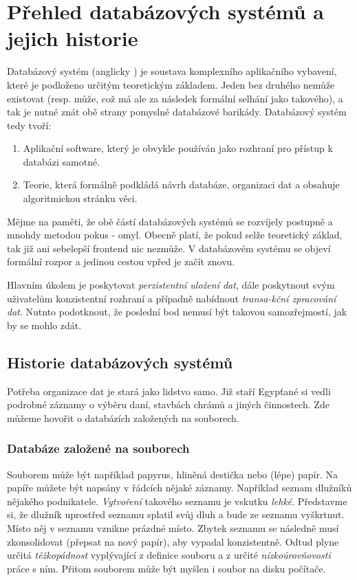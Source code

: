 \section{Přehled databázových systémů a jejich historie}

Databázový systém (anglicky ) je soustava komplexního aplikačního vybavení, které je podloženo určitým teoretickým základem. Jeden bez druhého nemůže existovat (resp. může, což má ale za následek formální selhání  jako takového), a tak je nutné znát obě strany pomyslné databázové barikády. Databázový systém tedy tvoří:
\begin{enumerate}
\item Aplikační software, který je obvykle používán jako rozhraní pro přístup k databázi samotné.
\item Teorie, která formálně podkládá návrh databáze, organizaci dat a obsahuje algoritmickou stránku věci.
\end{enumerate}

Mějme na paměti, že obě částí databázových systémů se rozvíjely postupně a mnohdy metodou pokus - omyl. Obecně platí, že pokud selže teoretický základ, tak již ani sebelepší frontend nic nezmůže. V databázovém systému se objeví formální rozpor a jedinou cestou vpřed je začít znovu.

Hlavním úkolem  je poskytovat \textit{perzistentní uložení dat}, dále poskytnout svým uživatelům konzistentní rozhraní a případně nabídnout \textit{transa-kční zpracování dat}. Nutnto podotknout, že poslední bod nemusí být takovou samozřejmostí, jak by se mohlo zdát.

\subsection{Historie databázových systémů}
Potřeba organizace dat je stará jako lidstvo samo. Již staří Egypťané si vedli podrobné záznamy o výběru daní, stavbách chrámů a jiných činnostech. Zde můžeme hovořit o databázích založených na souborech.

\subsubsection{Databáze založené na souborech}
Souborem může být například papyrus, hliněná destička nebo (lépe) papír. Na papíře můžete být napsány v řádcích nějaké záznamy. Například seznam dlužníků nějakého podnikatele. \textit{Vytvoření} takového seznamu je vskutku \textit{lehké}. Představme si, že dlužník uprostřed seznamu splatil svůj dluh a bude ze seznamu vyškrtnut. Místo něj v seznamu vznikne prázdné místo. Zbytek seznamu se následně musí zkonsolidovat (přepsat na nový papír), aby vypadal konzistentně. Odtud plyne určitá \textit{těžkopádnost} vyplývající z definice souboru a z určité \textit{nízkoúrovňovosti} práce s ním. Přitom souborem může být myšlen i soubor na disku počítače.

